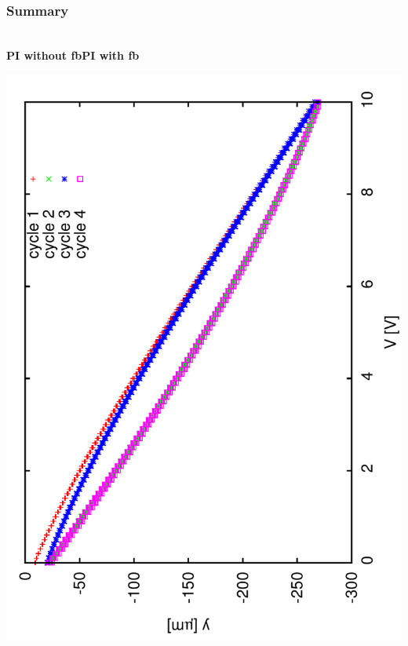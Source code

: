 \documentclass[a4paper,11pt]{book}
\begin{document}
 \subsubsection{Summary}
 \\
\textbf{PI without fb}\hspace*{4cm}\textbf{PI with  fb}\par
\includegraphics[angle=-90,scale=0.10]{image12.pdf}\hspace*{2cm}
\end{document}
